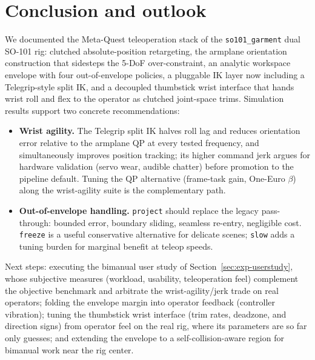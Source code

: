 \section{Conclusion and outlook}
\label{sec:conclusion}

We documented the Meta-Quest teleoperation stack of the
\texttt{so101\_garment} dual SO-101 rig: clutched absolute-position
retargeting, the armplane orientation construction that sidesteps the 5-DoF
over-constraint, an analytic workspace envelope with four out-of-envelope
policies, a pluggable IK layer now including a Telegrip-style split IK, and
a decoupled thumbstick wrist interface that hands wrist roll and flex to the
operator as clutched joint-space trims. Simulation results support two
concrete recommendations:
\begin{itemize}
  \item \textbf{Wrist agility.} The Telegrip split IK halves roll lag and
  reduces orientation error relative to the armplane QP at every tested
  frequency, and simultaneously improves position tracking; its higher
  command jerk argues for hardware validation (servo wear, audible
  chatter) before promotion to the pipeline default. Tuning the QP
  alternative (frame-task gain, One-Euro \(\beta\)) along the wrist-agility
  suite is the complementary path.
  \item \textbf{Out-of-envelope handling.} \texttt{project} should replace
  the legacy pass-through: bounded error, boundary sliding, seamless
  re-entry, negligible cost. \texttt{freeze} is a useful conservative
  alternative for delicate scenes; \texttt{slow} adds a tuning burden for
  marginal benefit at teleop speeds.
\end{itemize}
Next steps: executing the bimanual user study of
Section~\ref{sec:exp-userstudy}, whose subjective measures (workload,
usability, teleoperation feel) complement the objective benchmark and
arbitrate the wrist-agility/jerk trade on real operators; folding the
envelope margin into operator feedback (controller vibration); tuning the
thumbstick wrist interface (trim rates, deadzone, and direction signs) from
operator feel on the real rig, where its parameters are so far only
guesses; and extending the envelope to a self-collision-aware region for
bimanual work near the rig center.

